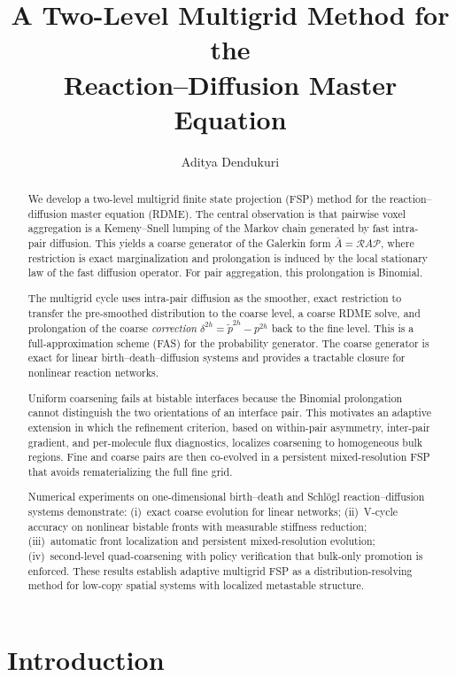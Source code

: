 \documentclass[11pt]{article}
\title{A Two-Level Multigrid Method for the\\
Reaction--Diffusion Master Equation}
\author{Aditya Dendukuri}
\date{}
\newcommand{\R}{\mathcal{R}}
\newcommand{\Pcal}{\mathcal{P}}
\begin{document}
\maketitle

\begin{abstract}
We develop a two-level multigrid finite state projection (FSP) method for the
reaction--diffusion master equation (RDME). The central observation is that
pairwise voxel aggregation is a Kemeny--Snell lumping of the Markov chain
generated by fast intra-pair diffusion. This yields a coarse generator of the
Galerkin form $\bar A = \R A \Pcal$, where restriction is exact marginalization
and prolongation is induced by the local stationary law of the fast diffusion
operator. For pair aggregation, this prolongation is Binomial.

The multigrid cycle uses intra-pair diffusion as the smoother, exact restriction
to transfer the pre-smoothed distribution to the coarse level, a coarse RDME
solve, and prolongation of the coarse \emph{correction} $\delta^{2h} = \tilde
p^{2h} - p^{2h}$ back to the fine level.  This is a full-approximation
scheme (FAS) for the probability generator.  The coarse generator is exact for
linear birth--death--diffusion systems and provides a tractable closure for
nonlinear reaction networks.

Uniform coarsening fails at bistable interfaces because the Binomial
prolongation cannot distinguish the two orientations of an interface pair.
This motivates an adaptive extension in which the refinement criterion, based on
within-pair asymmetry, inter-pair gradient, and per-molecule flux diagnostics,
localizes coarsening to homogeneous bulk regions.  Fine and coarse pairs are
then co-evolved in a persistent mixed-resolution FSP that avoids rematerializing
the full fine grid.

Numerical experiments on one-dimensional birth--death and Schl\"ogl
reaction--diffusion systems demonstrate: (i)~exact coarse evolution for linear
networks; (ii)~V-cycle accuracy on nonlinear bistable fronts with measurable
stiffness reduction; (iii)~automatic front localization and persistent
mixed-resolution evolution; (iv)~second-level quad-coarsening with policy
verification that bulk-only promotion is enforced. These results establish
adaptive multigrid FSP as a distribution-resolving method for low-copy spatial
systems with localized metastable structure.
\end{abstract}

\section{Introduction}
\end{document}
